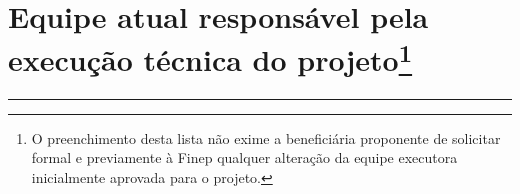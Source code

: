 \documentclass[a4paper,12pt]{article}
\begin{document}
\section
[\texorpdfstring{Equipe atual responsável pela execução técnica do projeto}{Equipe atual responsável pela execução técnica do projeto}]
{Equipe atual responsável pela execução técnica do projeto\protect\footnote{O preenchimento desta lista não exime a beneficiária proponente de solicitar formal e previamente à Finep qualquer alteração da equipe executora inicialmente aprovada para o projeto.}}



\vspace{-0.8cm} %
\rule{\textwidth}{2pt} %

\begin{table}[h]
\centering
{}
\end{table}

\newpage
\end{document}
